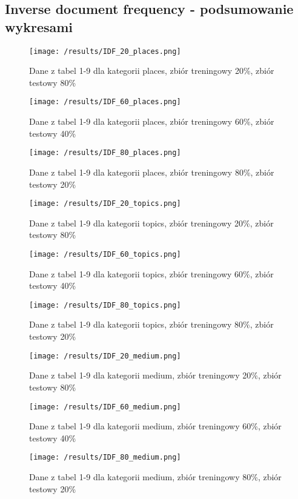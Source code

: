 \documentclass{classrep}
\begin{document}
\subsection{Inverse document frequency - podsumowanie wykresami}
\begin{figure}[H]
	\centering
	\texttt{[image: /results/IDF\_20\_places.png]}
	\caption{Dane z tabel 1-9 dla kategorii places, zbiór treningowy 20\%, zbiór testowy 80\%}
\end{figure}
\begin{figure}[H]
	\centering
	\texttt{[image: /results/IDF\_60\_places.png]}
	\caption{Dane z tabel 1-9 dla kategorii places, zbiór treningowy 60\%, zbiór testowy 40\%}
\end{figure}
\begin{figure}[H]
	\centering
	\texttt{[image: /results/IDF\_80\_places.png]}
	\caption{Dane z tabel 1-9 dla kategorii places, zbiór treningowy 80\%, zbiór testowy 20\%}
\end{figure}
\begin{figure}[H]
	\centering
	\texttt{[image: /results/IDF\_20\_topics.png]}
	\caption{Dane z tabel 1-9 dla kategorii topics, zbiór treningowy 20\%, zbiór testowy 80\%}
\end{figure}
\begin{figure}[H]
	\centering
	\texttt{[image: /results/IDF\_60\_topics.png]}
	\caption{Dane z tabel 1-9 dla kategorii topics, zbiór treningowy 60\%, zbiór testowy 40\%}
\end{figure}
\begin{figure}[H]
	\centering
	\texttt{[image: /results/IDF\_80\_topics.png]}
	\caption{Dane z tabel 1-9 dla kategorii topics, zbiór treningowy 80\%, zbiór testowy 20\%}
\end{figure}
\begin{figure}[H]
	\centering
	\texttt{[image: /results/IDF\_20\_medium.png]}
	\caption{Dane z tabel 1-9 dla kategorii medium, zbiór treningowy 20\%, zbiór testowy 80\%}
\end{figure}
\begin{figure}[H]
	\centering
	\texttt{[image: /results/IDF\_60\_medium.png]}
	\caption{Dane z tabel 1-9 dla kategorii medium, zbiór treningowy 60\%, zbiór testowy 40\%}
\end{figure}
\begin{figure}[H]
	\centering
	\texttt{[image: /results/IDF\_80\_medium.png]}
	\caption{Dane z tabel 1-9 dla kategorii medium, zbiór treningowy 80\%, zbiór testowy 20\%}
\end{figure}
\end{document}

